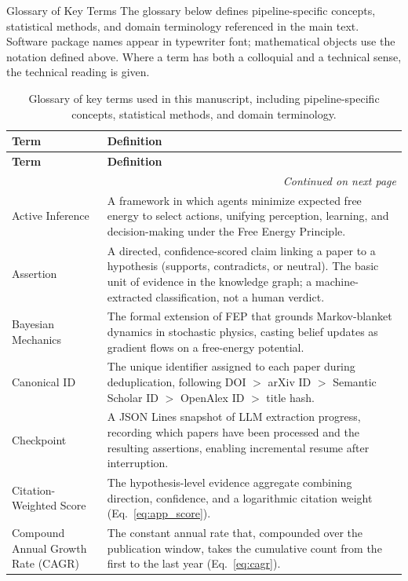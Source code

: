 \documentclass[
  ignorenonframetext,
]{beamer}
\begin{document}
\begin{frame}[allowframebreaks]{Glossary of Key Terms}
\protect{}\label{glossary-of-key-terms}
The glossary below defines pipeline-specific concepts, statistical
methods, and domain terminology referenced in the main text. Software
package names appear in typewriter font; mathematical objects use the
notation defined above. Where a term has both a colloquial and a
technical sense, the technical reading is given.

\begin{longtable}{p{4cm}p{11cm}}
\caption{Glossary of key terms used in this manuscript, including pipeline-specific concepts, statistical methods, and domain terminology.}
\label{tab:glossary} \\
\toprule
\textbf{Term} & \textbf{Definition} \\
\midrule
\endfirsthead
\toprule
\textbf{Term} & \textbf{Definition} \\
\midrule
\endhead
\midrule
\multicolumn{2}{r}{\textit{Continued on next page}} \\
\endfoot
\bottomrule
\endlastfoot
Active Inference & A framework in which agents minimize expected free energy to select actions, unifying perception, learning, and decision-making under the Free Energy Principle. \\
Assertion & A directed, confidence-scored claim linking a paper to a hypothesis (supports, contradicts, or neutral). The basic unit of evidence in the knowledge graph; a machine-extracted classification, not a human verdict. \\
Bayesian Mechanics & The formal extension of FEP that grounds Markov-blanket dynamics in stochastic physics, casting belief updates as gradient flows on a free-energy potential. \\
Canonical ID & The unique identifier assigned to each paper during deduplication, following DOI $>$ arXiv ID $>$ Semantic Scholar ID $>$ OpenAlex ID $>$ title hash. \\
Checkpoint & A JSON Lines snapshot of LLM extraction progress, recording which papers have been processed and the resulting assertions, enabling incremental resume after interruption. \\
Citation-Weighted Score & The hypothesis-level evidence aggregate combining direction, confidence, and a logarithmic citation weight (Eq.~\ref{eq:app_score}). \\
Compound Annual Growth Rate (CAGR) & The constant annual rate that, compounded over the publication window, takes the cumulative count from the first to the last year (Eq.~\ref{eq:cagr}). \\

\end{longtable}
\end{frame}
\end{document}
